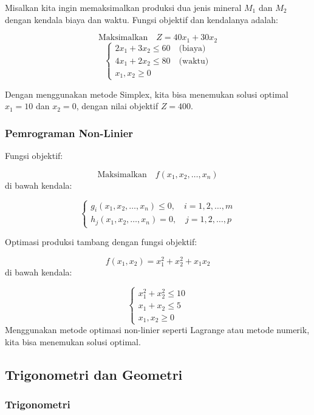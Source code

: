 \documentclass[
]{book}
\begin{document}
Misalkan kita ingin memaksimalkan produksi dua jenis mineral \(M_1\) dan \(M_2\) dengan kendala biaya dan waktu. Fungsi objektif dan kendalanya adalah:

\[
\text{Maksimalkan} \quad Z = 40x_1 + 30x_2
\]
\[
\begin{cases}
2x_1 + 3x_2 \le 60 \quad \text{(biaya)} \\
4x_1 + 2x_2 \le 80 \quad \text{(waktu)} \\
x_1, x_2 \ge 0
\end{cases}
\]

Dengan menggunakan metode Simplex, kita bisa menemukan solusi optimal \(x_1 = 10\) dan \(x_2 = 0\), dengan nilai objektif \(Z = 400\).

\subsubsection*{Pemrograman Non-Linier}\label{pemrograman-non-linier}

Fungsi objektif:

\[
\text{Maksimalkan} \quad f(x_1, x_2, \ldots, x_n)
\]
di bawah kendala:

\[
\begin{cases}
g_i(x_1, x_2, \ldots, x_n) \le 0, \quad i = 1, 2, \ldots, m \\
h_j(x_1, x_2, \ldots, x_n) = 0, \quad j = 1, 2, \ldots, p
\end{cases}
\]

Optimasi produksi tambang dengan fungsi objektif:

\[
f(x_1, x_2) = x_1^2 + x_2^2 + x_1x_2
\]
di bawah kendala:

\[
\begin{cases}
x_1^2 + x_2^2 \le 10 \\
x_1 + x_2 \le 5 \\
x_1, x_2 \ge 0
\end{cases}
\]
Menggunakan metode optimasi non-linier seperti Lagrange atau metode numerik, kita bisa menemukan solusi optimal.

\subsection{Trigonometri dan Geometri}\label{trigonometri-dan-geometri}

\subsubsection*{Trigonometri}\label{trigonometri}
\end{document}
